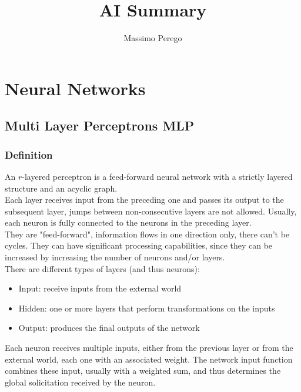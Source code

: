 \documentclass{article}
\begin{document}
	
	\title{AI Summary}
	\author{Massimo Perego}
	\date{}
	\maketitle
	
	\tableofcontents
	
	\newpage
	
	\section{Neural Networks}
	
	\subsection{Multi Layer Perceptrons MLP}
	
	\subsubsection{Definition}
	An $r$-layered perceptron is a feed-forward neural network with a strictly layered structure and an acyclic graph.\\
	
	Each layer receives input from the preceding one and passes its output to the subsequent layer, jumps between non-consecutive layers are not allowed. Usually, each neuron is fully connected to the neurons in the preceding layer. \\
	
	They are "feed-forward", information flows in one direction only, there can't be cycles. They can have significant processing capabilities, since they can be increased by increasing the number of neurons and/or layers.\\
	
	There are different types of layers (and thus neurons):
	\begin{itemize}
		\item Input: receive inputs from the external world
		\item Hidden: one or more layers that perform transformations on the inputs
		\item Output: produces the final outputs of the network
	\end{itemize}
	
	Each neuron receives multiple inputs, either from the previous layer or from the external world, each one with an associated weight. The network input function combines these input, usually with a weighted sum, and thus determines the global solicitation received by the neuron.\\
	
\end{document}
